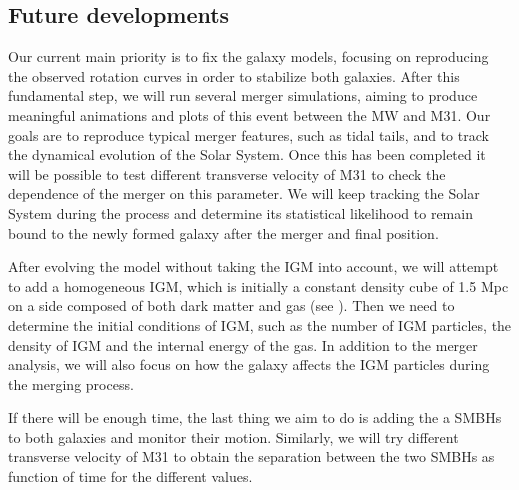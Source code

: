 \documentclass[a4paper,12pt, english]{article}
\begin{document}
\subsection{Future developments}
Our current main priority is to fix the galaxy models, focusing on reproducing the observed rotation curves in order to stabilize both galaxies. After this fundamental step, we will run several merger simulations, aiming to produce meaningful animations and plots of this event between the MW and M31. Our goals are to reproduce typical merger features, such as tidal tails, and to track the dynamical evolution of the Solar System. Once this has been completed it will be possible to test different transverse velocity of M31 to check the dependence of the merger on this parameter. We will keep tracking the Solar System during the process and determine its statistical likelihood to remain bound to the newly formed galaxy after the merger and final position.\par
\smallskip
After evolving the model without taking the IGM into account, we will attempt to add a homogeneous IGM, which is initially a constant density cube of 1.5 Mpc on a side composed of both dark matter and gas (see \textcite{Cox_2008}). Then we need to determine the initial conditions of IGM, such as the number of IGM particles, the density of IGM and the internal energy of the gas. In addition to the merger analysis, we will also focus on how the galaxy affects the IGM particles during the merging process.\par
\smallskip
If there will be enough time, the last thing we aim to do is adding the a SMBHs to both galaxies and monitor their motion. Similarly, we will try different transverse velocity of M31 to obtain the separation between the two SMBHs as function of time for the different values.\par
\fi
\newpage
\setlength{}
\printbibliography[heading=bibintoc,title={References}]


\appendix
\end{document}
